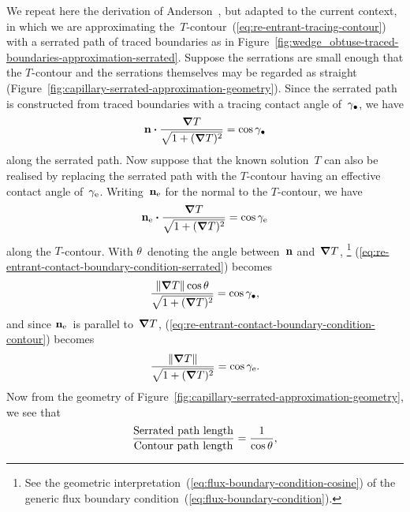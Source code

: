 We repeat here the derivation of
Anderson~\cite[Section~6.4.2]{anderson-2002-thesis-boundary-tracing-pdes},
but adapted to the current context,
in which we are approximating
the~$T$-contour~(\ref{eq:re-entrant-tracing-contour})
with a serrated path of traced boundaries
as in Figure~\ref{fig:wedge_obtuse-traced-boundaries-approximation-serrated}.
Suppose the serrations are small enough
that the $T$-contour and the serrations themselves
may be regarded as straight
(Figure~\ref{fig:capillary-serrated-approximation-geometry}).
Since the serrated path is constructed from traced boundaries
with a tracing contact angle of~$\gamma_\bullet$,
we have
\begin{equation}
  \mathop{}\!\boldsymbol{\mathbf{n}} \boldsymbol{\cdot} \frac{\mathop{}\!\boldsymbol{\mathbf{\nabla}} T}{\sqrt{1 + (\mathop{}\!\boldsymbol{\mathbf{\nabla}} T)^2}} = \cos\gamma_\bullet
  \label{eq:re-entrant-contact-boundary-condition-serrated}
\end{equation}
along the serrated path.
Now suppose that the known solution~$T$ can also be realised
by replacing the serrated path with the $T$-contour
having an effective contact angle of~$\gamma_{\mathrm{e}}$.
Writing~$\mathop{}\!\boldsymbol{\mathbf{n}}_{\mathrm{e}}$ for the normal to the $T$-contour,
we have
\begin{equation}
  \mathop{}\!\boldsymbol{\mathbf{n}}_{\mathrm{e}} \boldsymbol{\cdot} \frac{\mathop{}\!\boldsymbol{\mathbf{\nabla}} T}{\sqrt{1 + (\mathop{}\!\boldsymbol{\mathbf{\nabla}} T)^2}} = \cos\gamma_{\mathrm{e}}
  \label{eq:re-entrant-contact-boundary-condition-contour}
\end{equation}
along the $T$-contour.
With $\theta$~denoting the angle between~$\mathop{}\!\boldsymbol{\mathbf{n}}$ and~$\mathop{}\!\boldsymbol{\mathbf{\nabla}} T$,%
\footnote{
  See the geometric interpretation~(\ref{eq:flux-boundary-condition-cosine})
  of the generic flux boundary condition~(\ref{eq:flux-boundary-condition}).
}
(\ref{eq:re-entrant-contact-boundary-condition-serrated}) becomes
\begin{equation}
  \frac{\lVert\mathop{}\!\boldsymbol{\mathbf{\nabla}} T\rVert \cos\theta}{\sqrt{1 + (\mathop{}\!\boldsymbol{\mathbf{\nabla}} T)^2}} = \cos\gamma_\bullet,
  \label{eq:re-entrant-contact-boundary-condition-serrated-simplified}
\end{equation}
and since $\mathop{}\!\boldsymbol{\mathbf{n}}_{\mathrm{e}}$~is parallel to~$\mathop{}\!\boldsymbol{\mathbf{\nabla}} T$,
(\ref{eq:re-entrant-contact-boundary-condition-contour}) becomes
\begin{equation}
  \frac{\lVert\mathop{}\!\boldsymbol{\mathbf{\nabla}} T\rVert}{\sqrt{1 + (\mathop{}\!\boldsymbol{\mathbf{\nabla}} T)^2}} = \cos\gamma_{\mathrm{e}}.
  \label{eq:re-entrant-contact-boundary-condition-contour-simplified}
\end{equation}
Now from the geometry
of Figure~\ref{fig:capillary-serrated-approximation-geometry},
we see that
\begin{equation}
  \frac{\textnormal{Serrated path length}}{\textnormal{Contour path length}}
   = \frac{1}{\cos\theta},
   \label{eq:path-length-ratio}
\end{equation}
